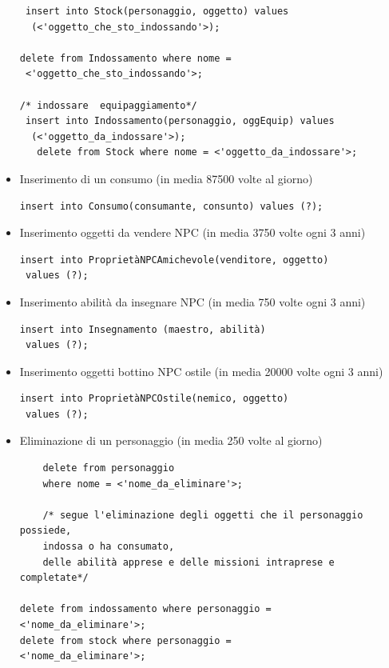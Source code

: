 \begin{itemize}
\begin{verbatim}
 insert into Stock(personaggio, oggetto) values
  (<'oggetto_che_sto_indossando'>);
  
delete from Indossamento where nome =
 <'oggetto_che_sto_indossando'>;
 
/* indossare  equipaggiamento*/
 insert into Indossamento(personaggio, oggEquip) values
  (<'oggetto_da_indossare'>);
   delete from Stock where nome = <'oggetto_da_indossare'>;

\end{verbatim}

\item Inserimento di un consumo  (in media  87500 volte al giorno)

\begin{verbatim}
insert into Consumo(consumante, consunto) values (?);

\end{verbatim}
\item Inserimento oggetti da vendere NPC (in media 3750 volte ogni 3 anni)

\begin{verbatim}
insert into ProprietàNPCAmichevole(venditore, oggetto)
 values (?);

\end{verbatim}
\item Inserimento abilità da insegnare NPC (in media 750 volte ogni 3 anni) 

\begin{verbatim}
insert into Insegnamento (maestro, abilità)
 values (?);

\end{verbatim}
\item Inserimento oggetti bottino NPC ostile (in media 20000 volte ogni 3 anni) 
\begin{verbatim}
insert into ProprietàNPCOstile(nemico, oggetto)
 values (?);

\end{verbatim}
\item Eliminazione di un personaggio (in media 250 volte al giorno)

\begin{verbatim}
	delete from personaggio 
	where nome = <'nome_da_eliminare'>;

	/* segue l'eliminazione degli oggetti che il personaggio possiede,
	indossa o ha consumato,
	delle abilità apprese e delle missioni intraprese e completate*/ 
	
delete from indossamento where personaggio =
<'nome_da_eliminare'>;
delete from stock where personaggio =
<'nome_da_eliminare'>;


\end{verbatim}
\end{itemize}
